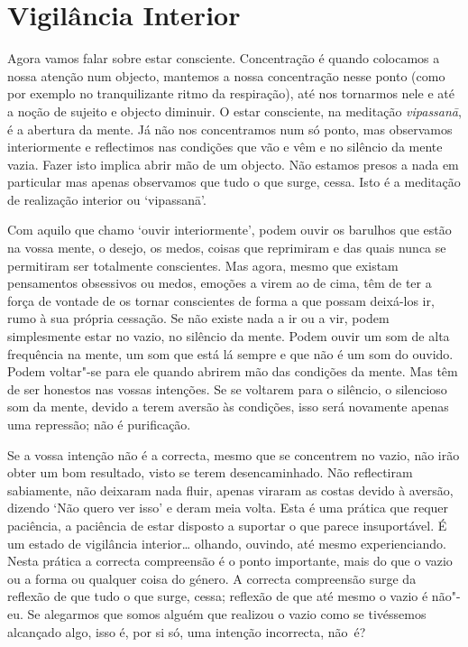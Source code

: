 \chapter{Vigilância Interior}

Agora vamos falar sobre estar consciente. Concentração é quando
colocamos a nossa atenção num objecto, mantemos a nossa concentração
nesse ponto (como por exemplo no tranquilizante ritmo da respiração),
até nos tornarmos nele e até a noção de sujeito e objecto diminuir. O estar
consciente, na meditação \emph{vipassanā}, é a abertura da mente. Já não
nos concentramos num só ponto, mas observamos interiormente e
reflectimos nas condições que vão e vêm e no silêncio da mente vazia.
Fazer isto implica abrir mão de um objecto. Não estamos presos a nada em
particular mas apenas observamos que tudo o que surge, cessa. Isto é a
meditação de realização interior ou `vipassanā'.

Com aquilo que chamo `ouvir interiormente', podem ouvir os barulhos que
estão na vossa mente, o desejo, os medos, coisas que reprimiram e das
quais nunca se permitiram ser totalmente conscientes. Mas agora, mesmo
que existam pensamentos obsessivos ou medos, emoções a virem ao de cima,
têm de ter a força de vontade de os tornar conscientes de forma a que
possam deixá-los ir, rumo à sua própria cessação. Se não existe nada a
ir ou a vir, podem simplesmente estar no vazio, no silêncio da mente.
Podem ouvir um som de alta frequência na mente, um som que está lá
sempre e que não é um som do ouvido. Podem voltar"-se para ele quando
abrirem mão das condições da mente. Mas têm de ser honestos nas vossas
intenções. Se se voltarem para o silêncio, o silencioso som da mente,
devido a terem aversão às condições, isso será novamente apenas uma
repressão; não é purificação.

Se a vossa intenção não é a correcta, mesmo que se concentrem no vazio,
não irão obter um bom resultado, visto se terem desencaminhado. Não
reflectiram sabiamente, não deixaram nada fluir, apenas viraram as
costas devido à aversão, dizendo `Não quero ver isso' e deram meia
volta. Esta é uma prática que requer paciência, a paciência de estar
disposto a suportar o que parece insuportável. É um estado de
vigilância interior\ldots{} olhando, ouvindo, até mesmo experienciando.
Nesta prática a correcta compreensão é o ponto importante, mais do que o
vazio ou a forma ou qualquer coisa do género. A correcta compreensão
surge da reflexão de que tudo o que surge, cessa; reflexão de que até
mesmo o vazio é não"-eu. Se alegarmos que somos alguém que realizou o
vazio como se tivéssemos alcançado algo, isso é, por si só, uma intenção
incorrecta, não~é?

